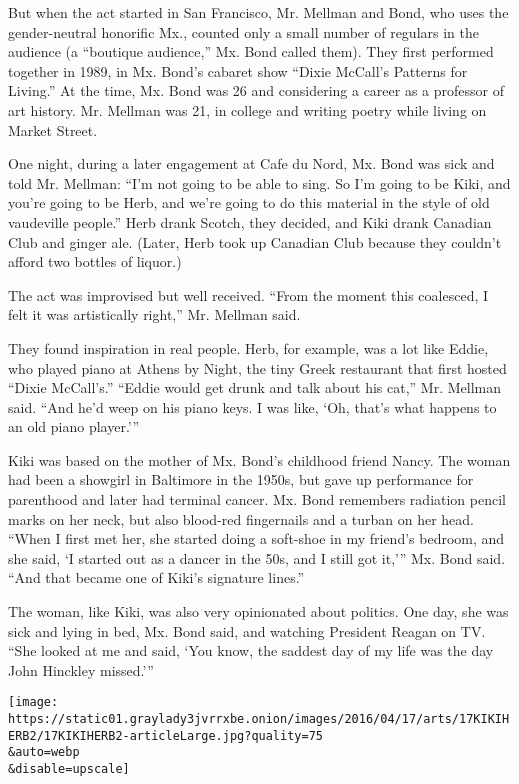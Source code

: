 But when the act started in San Francisco, Mr. Mellman and Bond, who
uses the gender-neutral honorific Mx., counted only a small number of
regulars in the audience (a ``boutique audience,'' Mx. Bond called
them). They first performed together in 1989, in Mx. Bond's cabaret show
``Dixie McCall's Patterns for Living.'' At the time, Mx. Bond was 26 and
considering a career as a professor of art history. Mr. Mellman was 21,
in college and writing poetry while living on Market Street.

One night, during a later engagement at Cafe du Nord, Mx. Bond was sick
and told Mr. Mellman: ``I'm not going to be able to sing. So I'm going
to be Kiki, and you're going to be Herb, and we're going to do this
material in the style of old vaudeville people.'' Herb drank Scotch,
they decided, and Kiki drank Canadian Club and ginger ale. (Later, Herb
took up Canadian Club because they couldn't afford two bottles of
liquor.)

The act was improvised but well received. ``From the moment this
coalesced, I felt it was artistically right,'' Mr. Mellman said.

They found inspiration in real people. Herb, for example, was a lot like
Eddie, who played piano at Athens by Night, the tiny Greek restaurant
that first hosted ``Dixie McCall's.'' ``Eddie would get drunk and talk
about his cat,'' Mr. Mellman said. ``And he'd weep on his piano keys. I
was like, `Oh, that's what happens to an old piano player.'''

Kiki was based on the mother of Mx. Bond's childhood friend Nancy. The
woman had been a showgirl in Baltimore in the 1950s, but gave up
performance for parenthood and later had terminal cancer. Mx. Bond
remembers radiation pencil marks on her neck, but also blood-red
fingernails and a turban on her head. ``When I first met her, she
started doing a soft-shoe in my friend's bedroom, and she said, `I
started out as a dancer in the 50s, and I still got it,''' Mx. Bond
said. ``And that became one of Kiki's signature lines.''

The woman, like Kiki, was also very opinionated about politics. One day,
she was sick and lying in bed, Mx. Bond said, and watching President
Reagan on TV. ``She looked at me and said, `You know, the saddest day of
my life was the day John Hinckley missed.'''

\texttt{[image: https://static01.graylady3jvrrxbe.onion/images/2016/04/17/arts/17KIKIHERB2/17KIKIHERB2-articleLarge.jpg?quality=75\\\&auto=webp\\\&disable=upscale]}

